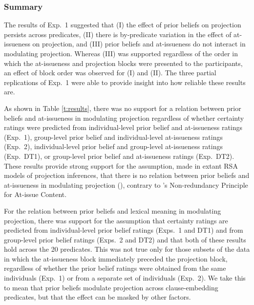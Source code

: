\documentclass[11pt,fleqn]{article}
\newcommand{\6}{\mbox{$[\hspace*{-.6mm}[$}}
\newcommand{\9}{\mbox{$]\hspace*{-.6mm}]$}}
\newcommand{\citepos}[1]{\citeauthor{#1}'s \citeyear{#1}}
\begin{document}
\subsubsection{Summary}

The results of Exp.~1 suggested that (I) the effect of prior beliefs on projection persists across predicates, (II) there is by-predicate variation in the effect of at-issueness on projection, and (III) prior beliefs and at-issueness do not interact in modulating projection. Whereas (III) was supported regardless of the order in which the at-issueness and projection blocks were presented to the participants, an effect of block order was observed for (I) and (II). The three partial replications of Exp.~1 were able to provide insight into how reliable these results are.



As shown in Table \ref{t:results}, there was no support for a relation between prior beliefs and at-issueness in modulating projection regardless of whether certainty ratings were predicted from individual-level prior belief and at-issueness ratings (Exp.~1), group-level prior belief and individual-level at-issueness ratings (Exp.~2), individual-level prior belief and group-level at-issueness ratings (Exp.~DT1), or group-level prior belief and at-issueness ratings (Exp.~DT2). These results provide strong support for the assumption, made in extant RSA models of projection inferences, that there is no relation between prior beliefs and at-issueness in modulating projection (\citealt{qing-etal2016,stevens-etal2017,warstadt2022,pan-degen2023}), contrary to \citepos{tonhauser-etal-eval} Non-redundancy Principle for At-issue Content.

For the relation between prior beliefs and lexical meaning in modulating projection, there was support for the assumption that certainty ratings are predicted from individual-level prior belief ratings (Exps.~1 and DT1) and from group-level prior belief ratings  (Exps.~2 and DT2) and that both of these results hold across the 20 predicates. This was not true only for those subsets of the data in which the at-issueness block immediately preceded the projection block, regardless of whether the prior belief ratings were obtained from the same individuals (Exp.~1) or from a separate set of individuals (Exp.~2). We take this to mean that prior beliefs modulate projection across clause-embedding predicates, but that the effect can be masked by other factors. 
\end{document}

